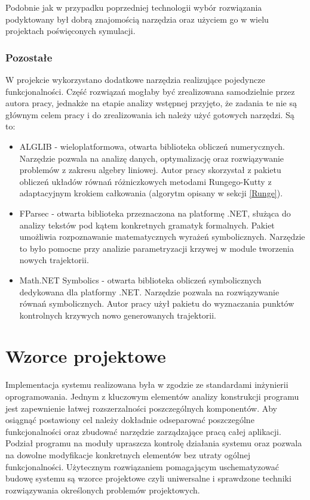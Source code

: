 \documentclass[12pt, twoside, openany]{report}
\theoremstyle{definition}
\begin{document}
Podobnie jak w przypadku poprzedniej technologii wybór rozwiązania podyktowany był dobrą znajomością narzędzia oraz użyciem go w wielu projektach poświęconych symulacji. 


\subsubsection{Pozostałe}
W projekcie wykorzystano dodatkowe narzędzia realizujące pojedyncze funkcjonalności. Część rozwiązań mogłaby być zrealizowana samodzielnie przez autora pracy, jednakże na etapie analizy wstępnej przyjęto, że zadania te nie są głównym celem pracy i do zrealizowania ich należy użyć gotowych narzędzi. Są to:
\begin{itemize}
\item ALGLIB - wieloplatformowa, otwarta biblioteka obliczeń numerycznych. Narzędzie pozwala na analizę danych, optymalizację oraz rozwiązywanie problemów z zakresu algebry liniowej. Autor pracy skorzystał z pakietu obliczeń układów równań różniczkowych metodami Rungego-Kutty z adaptacyjnym krokiem całkowania (algorytm opisany w sekcji \ref{Runge}). 
\item FParsec - otwarta biblioteka przeznaczona na platformę .NET, służąca do analizy tekstów pod kątem konkretnych gramatyk formalnych. Pakiet umożliwia rozpoznawanie matematycznych wyrażeń symbolicznych. Narzędzie to było pomocne przy analizie parametryzacji krzywej w module tworzenia nowych trajektorii.
\item Math.NET Symbolics - otwarta biblioteka obliczeń symbolicznych dedykowana dla platformy .NET. Narzędzie pozwala na rozwiązywanie równań symbolicznych. Autor pracy użył pakietu do wyznaczania punktów kontrolnych krzywych nowo generowanych trajektorii.
\end{itemize}

\section{Wzorce projektowe}
Implementacja systemu realizowana była w zgodzie ze standardami inżynierii oprogramowania. Jednym z kluczowym elementów analizy konstrukcji programu jest zapewnienie łatwej rozszerzalności poszczególnych komponentów. Aby osiągnąć postawiony cel należy dokładnie odseparować poszczególne funkcjonalności oraz zbudować narzędzie zarządzające pracą całej aplikacji. Podział programu na moduły upraszcza kontrolę działania systemu oraz pozwala na dowolne modyfikacje konkretnych elementów bez utraty ogólnej funkcjonalności. Użytecznym rozwiązaniem pomagającym uschematyzować budowę systemu są wzorce projektowe czyli uniwersalne i sprawdzone techniki rozwiązywania określonych problemów projektowych. 
\end{document}
